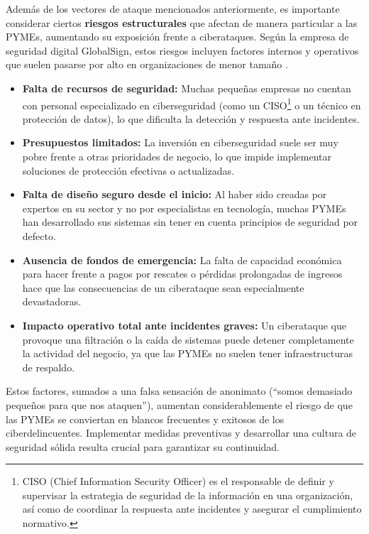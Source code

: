 \documentclass[a4paper, 11pt]{article}
\begin{document}
\begin{itemize}
\end{itemize}


Además de los vectores de ataque mencionados anteriormente, es importante considerar ciertos \textbf{riesgos estructurales} que afectan de manera particular a las PYMEs, aumentando su exposición frente a ciberataques. Según la empresa  de seguridad digital GlobalSign, estos riesgos incluyen factores internos y operativos que suelen pasarse por alto en organizaciones de menor tamaño \cite{toms2021}. 
\begin{itemize}
  \item \textbf{Falta de recursos de seguridad:} Muchas pequeñas empresas no cuentan con personal especializado en ciberseguridad (como un CISO\footnote{CISO (Chief Information Security Officer) es el responsable de definir y supervisar la estrategia de seguridad de la información en una organización, así como de coordinar la respuesta ante incidentes y asegurar el cumplimiento normativo.} o un técnico en protección de datos), lo que dificulta la detección y respuesta ante incidentes.
  \item \textbf{Presupuestos limitados:} La inversión en ciberseguridad suele ser muy pobre frente a otras prioridades de negocio, lo que impide implementar soluciones de protección efectivas o actualizadas.
  \item \textbf{Falta de diseño seguro desde el inicio:} Al haber sido creadas por expertos en su sector y no por especialistas en tecnología, muchas PYMEs han desarrollado sus sistemas sin tener en cuenta principios de seguridad por defecto.
  \item \textbf{Ausencia de fondos de emergencia:} La falta de capacidad económica para hacer frente a pagos por rescates o pérdidas prolongadas de ingresos hace que las consecuencias de un ciberataque sean especialmente devastadoras.
  \item \textbf{Impacto operativo total ante incidentes graves:} Un ciberataque que provoque una filtración o la caída de sistemas puede detener completamente la actividad del negocio, ya que las PYMEs no suelen tener infraestructuras de respaldo.
\end{itemize}


Estos factores, sumados a una falsa sensación de anonimato (“somos demasiado pequeños para que nos ataquen”), aumentan considerablemente el riesgo de que las PYMEs se conviertan en blancos frecuentes y exitosos de los 
ciberdelincuentes. Implementar medidas preventivas y desarrollar una cultura de seguridad sólida resulta crucial para garantizar su continuidad. 
\end{document}
